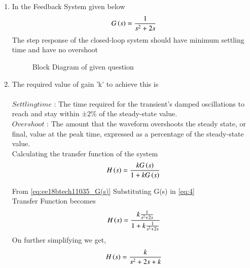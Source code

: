 \begin{enumerate}[label=\thesection.\arabic*.,ref=\thesection.\theenumi]

\item
In the Feedback System given below 
\begin{align}
\label{eq:ee18btech11035_G(s)}
G\left(s\right)=\frac{1}{s^2+2s}
\end{align}
The step response of the closed-loop system should have minimum settling time and have no overshoot
\begin{figure}[!ht]
    \begin{center}
		\resizebox{\columnwidth}{!}{}
	\end{center}
\caption{Block Diagram of given question}
\label{fig:block}
\end{figure}

\item The required value of gain 'k' to achieve this is\\
\solution \\
$Settling time$ : The time required for the transient's damped oscillations to
reach and stay within ±2\% of the steady-state value.\\
$Overshoot$ : The amount that the waveform overshoots the steady state, or final, value at the peak time, expressed as a percentage of the steady-state value.\\

Calculating the transfer function of the system
\begin{align}
H\left(s\right) = \frac{kG\left(s\right)}{1+kG\left(s\right)}
\label{eq:4}
\end{align}

From \eqref{eq:ee18btech11035_G(s)} Substituting G(s) in \eqref{eq:4} \\
Transfer Function becomes 
\begin{align}
H\left(s\right) = \frac{k\frac{1}{s^2+2s}}{1+k\frac{1}{s^2+2s}}
\end{align}
On further simplifying we get,\\
\begin{align}
H\left(s\right) = \frac{k}{s^2+2s+k}
\label{eq:H(s)}
\end{align}


\end{enumerate}
